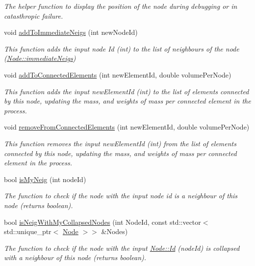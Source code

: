 \begin{DoxyCompactItemize}
\begin{DoxyCompactList}\small\item\em The helper function to display the position of the node during debugging or in catasthropic failure. \end{DoxyCompactList}\item 
void \hyperlink{classNode_ac2838f50304007a7cfe3df3f2e8d1772}{add\+To\+Immediate\+Neigs} (int new\+Node\+Id)
\begin{DoxyCompactList}\small\item\em This function adds the input node Id (int) to the list of neighbours of the node (\hyperlink{classNode_adac7d84db546cadec7a8193e6ff52bd6}{Node\+::immediate\+Neigs}) \end{DoxyCompactList}\item 
void \hyperlink{classNode_a2c6f029aa3388b8fb122139b1d24b71b}{add\+To\+Connected\+Elements} (int new\+Element\+Id, double volume\+Per\+Node)
\begin{DoxyCompactList}\small\item\em This function adds the input new\+Element\+Id (int) to the list of elements connected by this node, updating the mass, and weights of mass per connected element in the process. \end{DoxyCompactList}\item 
void \hyperlink{classNode_a6dc9c26deadb9d2ca3e248f4748d9dfc}{remove\+From\+Connected\+Elements} (int new\+Element\+Id, double volume\+Per\+Node)
\begin{DoxyCompactList}\small\item\em This function removes the input new\+Element\+Id (int) from the list of elements connected by this node, updating the mass, and weights of mass per connected element in the process. \end{DoxyCompactList}\item 
bool \hyperlink{classNode_abc1e7e6c42b377c073a68c2b2ea97fa8}{is\+My\+Neig} (int node\+Id)
\begin{DoxyCompactList}\small\item\em The function to check if the node with the input node id is a neighbour of this node (returns boolean). \end{DoxyCompactList}\item 
bool \hyperlink{classNode_aaf5ecd8e43cad8d619629d07bcaa1a8e}{is\+Neig\+With\+My\+Collapsed\+Nodes} (int Node\+Id, const std\+::vector$<$ std\+::unique\+\_\+ptr$<$ \hyperlink{classNode}{Node} $>$$>$ \&Nodes)
\begin{DoxyCompactList}\small\item\em The function to check if the node with the input \hyperlink{classNode_a1bd379569cc1a8b96432e61971aed4d9}{Node\+::\+Id} (node\+Id) is collapsed with a neighbour of this node (returns boolean). \end{DoxyCompactList}\item 
$$
\end{DoxyCompactItemize}
